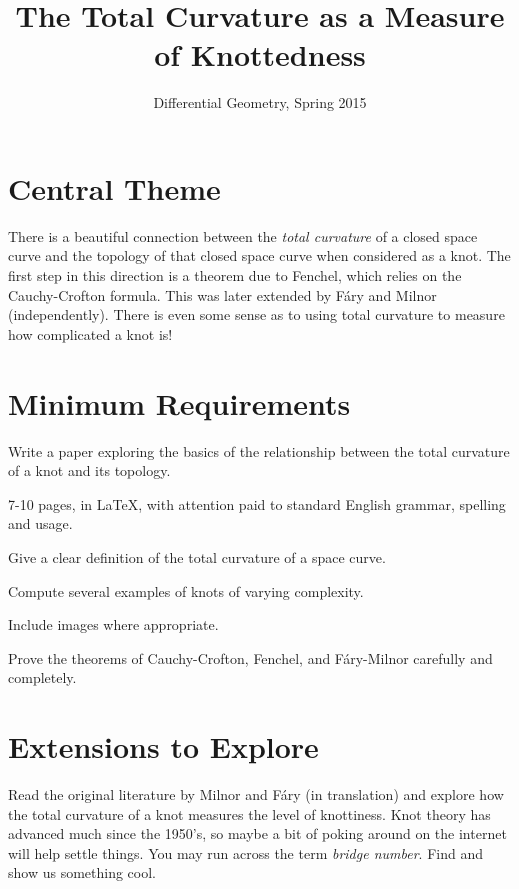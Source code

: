 \documentclass[12pt]{amsart}
\begin{document}
\title{The Total Curvature as a Measure of Knottedness}
\author{Differential Geometry, Spring 2015}

\maketitle

\section*{Central Theme}

There is a beautiful connection between the \emph{total curvature} of a closed space curve and the topology of that closed space curve when considered as a knot. The first step in this direction is a theorem due to Fenchel, which relies on the Cauchy-Crofton formula. This was later extended by F\'{a}ry and Milnor (independently). There is even some sense as to using total curvature to measure how complicated a knot is!

\section*{Minimum Requirements}

Write a paper exploring the basics of the relationship between the total curvature of a knot and its topology. 
\begin{compactitem}
\item 7-10 pages, in \LaTeX, with attention paid to standard English grammar, spelling and usage.
\item Give a clear definition of the total curvature of a space curve.
\item Compute several examples of knots of varying complexity.
\item Include images where appropriate.
\item Prove the theorems of Cauchy-Crofton, Fenchel, and F\'{a}ry-Milnor carefully and completely.
\end{compactitem}


\section*{Extensions to Explore}

Read the original literature by Milnor and F\'{a}ry (in translation) and explore how the 
total curvature of a knot measures the level of knottiness. Knot theory has advanced 
much since the 1950's, so maybe a bit of poking around on the internet will help settle 
things. You may run across the term \emph{bridge number}. Find and show us 
something cool.
\end{document}

